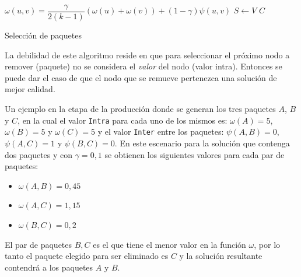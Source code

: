 \begin{center}
	\begin{algorithm}[H]
	\DontPrintSemicolon
	\SetAlgoLined
		$\omega(u,v) = \dfrac{\gamma}{2( k - 1)} (\omega(u) + \omega(v)) + (1 - \gamma)\psi(u,v)$\;
		$S \leftarrow V$\;
		\Return $C$\;
	\caption{Selección de paquetes}\label{alg:chooseBundles}
	\end{algorithm}
\end{center}

La debilidad de este algoritmo reside en que para seleccionar el próximo nodo a remover (paquete) no se considera el \textit{valor} del nodo (valor intra). Entonces se puede dar el caso de que el nodo que se remueve pertenezca una solución de mejor calidad.


Un ejemplo en la etapa de la producción donde se generan los tres paquetes $A$, $B$ y $C$, en la cual el valor \texttt{Intra} para cada uno de los mismos es: $\omega(A) = 5$, $\omega(B) = 5$ y $\omega(C) = 5$ y el valor \texttt{Inter} entre los paquetes: $\psi(A,B) = 0$, $\psi(A,C) = 1$ y $\psi(B,C) = 0$. En este escenario para la solución que contenga dos paquetes y con $\gamma=0,1$ se obtienen los siguientes valores para cada par de paquetes:
\begin{itemize}
	\item $\omega(A,B) = 0,45$
	\item $\omega(A,C) = 1,15$
	\item $\omega(B,C) = 0,2$
\end{itemize}
 
El par de paquetes $B, C$ es el que tiene el menor valor en la función $\omega$, por lo tanto el paquete elegido para ser eliminado es $C$ y la solución resultante contendrá a los paquetes $A$ y $B$. 

